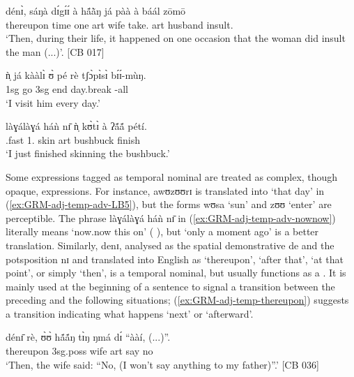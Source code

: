 \begin{exe}
\begin{exe}
\begin{exe}
\ex\label{ex:GRM-adj-temp-adv-CB17}
\gll {\ob}dénɪ̀{\cb},   {\ob}sáŋà   dɪ́gɪ́ɪ́{\cb}   à   hã́ã̀ŋ já   pàà à  báál   zōmō\\
thereupon time one   {\sc art}  wife  {\hab}   take.{\pl} {\sc art} husband insult.{\pl} \\
\glt `Then, during their life, it happened on one occasion that the woman
did insult  the man (...)'.  [CB 017]

\ex\label{ex:GRM-adj-temp-adv-everyday}
\gll  ǹ̩ já kààlɪ̀ ʊ̀ pé rè {\ob}{tʃɔ̀pɪ̀sɪ̀} bɪ́ɪ́-mùŋ{\cb}.\\
 {\sc 1sg} {\hab} go {\sc 3sg} end {\foc} day.break {\itr}-all\\
\glt `I visit him every day.'

\ex\label{ex:GRM-adj-temp-adv-nownow}
\gll {\ob}làɣálàɣá háǹ nɪ̄{\cb} ǹ̩ kʊ̀tɪ̀ à ʔã́ã́ pétí.\\
{\ideo}.fast {\dem} {\postp} {1.\sg} {skin} {\sc art} bushbuck  finish\\
\glt `I  just finished skinning the bushbuck.'


\z 
 \z


Some expressions tagged as temporal nominal are treated as complex, though opaque, expressions. For 
instance,  {\sls awʊzʊʊrɪ} is translated into  `that day' in (\ref{ex:GRM-adj-temp-adv-LB5}), 
but the forms {\sls wʊsa} `sun' and {\sls zʊʊ} `enter'  are perceptible. The phrase {\sls 
làɣálàɣá háǹ nɪ̄} in (\ref{ex:GRM-adj-temp-adv-nownow}) literally means `now.now this on' 
({\ideo} {\dem} {\postp}), but `only a moment ago'  is a better translation.  Similarly, {\sls 
denɪ}, analysed as the spatial demonstrative {\sls de} and the potsposition {\sls nɪ} and  
translated into English as `thereupon', `after that', `at that point', or simply `then',  is  a 
temporal nominal, but usually functions as a .  It is mainly used at the beginning of a 
sentence to signal a transition  between the preceding  and the following situations; 
(\ref{ex:GRM-adj-temp-thereupon}) suggests a transition  indicating what happens `next' or 
`afterward'.


\ea\label{ex:GRM-adj-temp-thereupon}
\gll dénɪ̄   rè,     ʊ̀ʊ̀      hã́ã́ŋ   tɪ̀ŋ ŋmá   dɪ́  ``ààí, (...)''.\\
 thereupon   {\foc}  {\sc 3sg.poss}  wife  {\sc art}  say   {\comp} no {}\\
\glt `Then, the wife said: ``No, (I won't
say anything to my father)''.' [CB 036]
\z


\end{exe}
\end{exe}
\end{exe}
